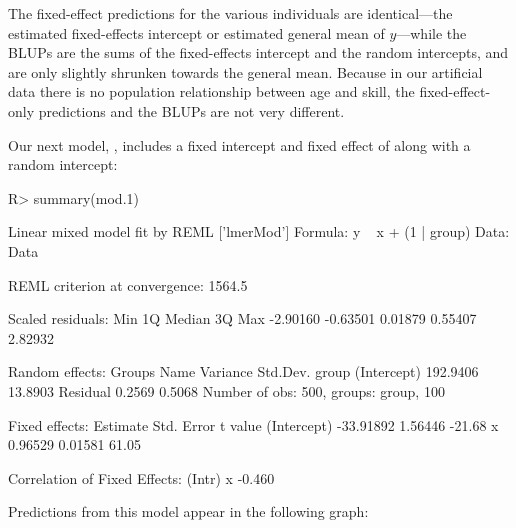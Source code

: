 \documentclass[
]{jss}
\begin{document}
The fixed-effect predictions for the various individuals are
identical---the estimated fixed-effects intercept or estimated general
mean of \(y\)---while the BLUPs are the sums of the fixed-effects
intercept and the random intercepts, and are only slightly shrunken
towards the general mean. Because in our artificial data there is no
population relationship between age and skill, the fixed-effect-only
predictions and the BLUPs are not very different.

Our next model, , includes a fixed intercept and fixed
effect of  along with a random intercept:

\begin{CodeChunk}
\begin{CodeInput}
R> summary(mod.1)
\end{CodeInput}
\begin{CodeOutput}
Linear mixed model fit by REML ['lmerMod']
Formula: y ~ x + (1 | group)
   Data: Data

REML criterion at convergence: 1564.5

Scaled residuals: 
     Min       1Q   Median       3Q      Max 
-2.90160 -0.63501  0.01879  0.55407  2.82932 

Random effects:
 Groups   Name        Variance Std.Dev.
 group    (Intercept) 192.9406 13.8903 
 Residual               0.2569  0.5068 
Number of obs: 500, groups:  group, 100

Fixed effects:
             Estimate Std. Error t value
(Intercept) -33.91892    1.56446  -21.68
x             0.96529    0.01581   61.05

Correlation of Fixed Effects:
  (Intr)
x -0.460
\end{CodeOutput}
\end{CodeChunk}

Predictions from this model appear in the following graph:
\end{document}
